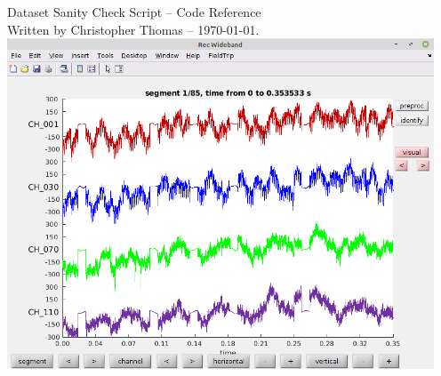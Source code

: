\documentclass[letterpaper,11pt]{report}
\begin{document}
%
%
\pagestyle{empty}

\begin{center}
%
\vspace*{1in}
{\Huge Dataset Sanity Check Script -- Code Reference} \\
{\footnotesize Written by Christopher Thomas -- \today.}
%
\vspace*{1.5in}\\
%
\includegraphics[width=5in]{plots/frey-20211105-dropouts}
%
\end{center}
%
\vfill
%
\clearpage
%
%
%
\pagestyle{plain}
\setcounter{page}{1}
%
\tableofcontents
\clearpage
%
%
%
\pagestyle{plain}
\setcounter{page}{1}
%

\clearpage
%

%
%
\end{document}

